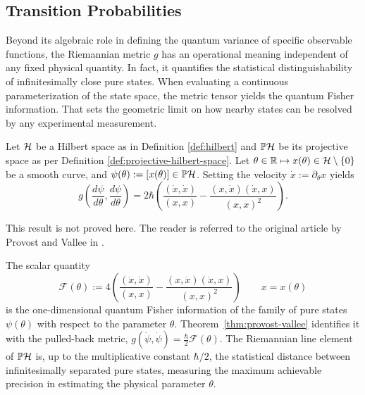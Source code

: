 \subsection*{Transition Probabilities}
 Beyond its algebraic role in defining the quantum variance of specific observable functions, the Riemannian metric $g$ has an operational meaning independent of any fixed physical quantity. In fact, it quantifies the  statistical distinguishability of infinitesimally close pure states. When evaluating a continuous parameterization of the state space, the metric tensor yields the quantum Fisher information. That sets the geometric limit on how nearby states can be resolved by any experimental measurement.

\begin{theorem}
	\label{thm:provost-vallee}
	Let $\H$ be a Hilbert space as in Definition \ref{def:hilbert} and $\PH$ be its projective space as per Definition \ref{def:projective-hilbert-space}. Let $\theta \in \R \mapsto x(\theta)\in\H\setminus\{0\}$ be a smooth curve, and $\psi(\theta):=[x(\theta)]\in\PH$. Setting the velocity $\dot x:=\partial_\theta x$ yields
	\begin{equation}
		g\left(\frac{d\psi}{d\theta},\frac{d\psi}{d\theta}\right)
		= 2\hbar\left(\frac{(\dot x,\dot x)}{(x,x)}-\frac{(x,\dot x)(\dot x,x)}{(x,x)^2}\right).
	\end{equation}
\end{theorem}
This result is not proved here. The reader is referred to the original article by Provost and Vallee in \cite[Section 2]{provostRiemannianStructureManifolds1980}.

\begin{remark}
	The scalar quantity
	\begin{equation}
		\mathcal F(\theta):=4\left(\frac{(\dot x,\dot x)}{(x,x)}-\frac{(x,\dot x)(\dot x,x)}{(x,x)^2}\right) \qquad x = x(\theta)
	\end{equation}
	is the one-dimensional quantum Fisher information of the family of pure states $\psi(\theta)$ with respect to the parameter $\theta$. Theorem~\ref{thm:provost-vallee} identifies it with the pulled-back metric, $g(\dot\psi,\dot\psi) = \frac\hbar2\mathcal F(\theta)$. The Riemannian line element of $\PH$ is, up to the multiplicative constant $\hbar/2$, the statistical distance between infinitesimally separated pure states, measuring the maximum achievable precision in estimating the physical parameter $\theta$.
\end{remark}


